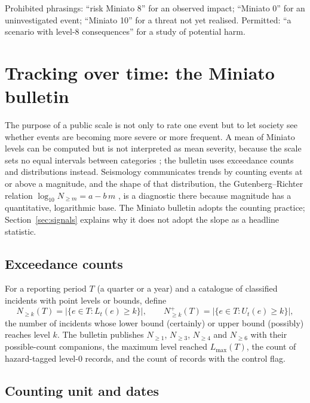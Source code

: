\documentclass[11pt,a4paper]{article}
\newcommand{\Nk}[1]{N_{\ge #1}}
\begin{document}
Prohibited phrasings: ``risk Miniato 8'' for an observed impact; ``Miniato 0'' for an uninvestigated event; ``Miniato 10'' for a threat not yet realised. Permitted: ``a scenario with level-8 consequences'' for a study of potential harm.

\section{Tracking over time: the Miniato bulletin}
\label{sec:bulletin}

The purpose of a public scale is not only to rate one event but to let society see whether events are becoming more severe or more frequent. A mean of Miniato levels can be computed but is not interpreted as mean severity, because the scale sets no equal intervals between categories \citep{stevens1946}; the bulletin uses exceedance counts and distributions instead. Seismology communicates trends by counting events at or above a magnitude, and the shape of that distribution, the Gutenberg--Richter relation $\log_{10} N_{\ge m} = a - b\,m$ \citep{gutenberg1944}, is a diagnostic there because magnitude has a quantitative, logarithmic base. The Miniato bulletin adopts the counting practice; Section~\ref{sec:signals} explains why it does not adopt the slope as a headline statistic.

\subsection{Exceedance counts}

For a reporting period $T$ (a quarter or a year) and a catalogue of classified incidents with point levels or bounds, define
\begin{equation}
\Nk{k}(T) = \bigl|\{ e \in T : L_t(e) \ge k \}\bigr| ,
\qquad
\Nk{k}^{+}(T) = \bigl|\{ e \in T : U_t(e) \ge k \}\bigr| ,
\end{equation}
the number of incidents whose lower bound (certainly) or upper bound (possibly) reaches level $k$. The bulletin publishes $\Nk{1}$, $\Nk{3}$, $\Nk{4}$ and $\Nk{6}$ with their possible-count companions, the maximum level reached $L_{\max}(T)$, the count of hazard-tagged level-0 records, and the count of records with the control flag.

\subsection{Counting unit and dates}
\label{sec:counting}
\end{document}

